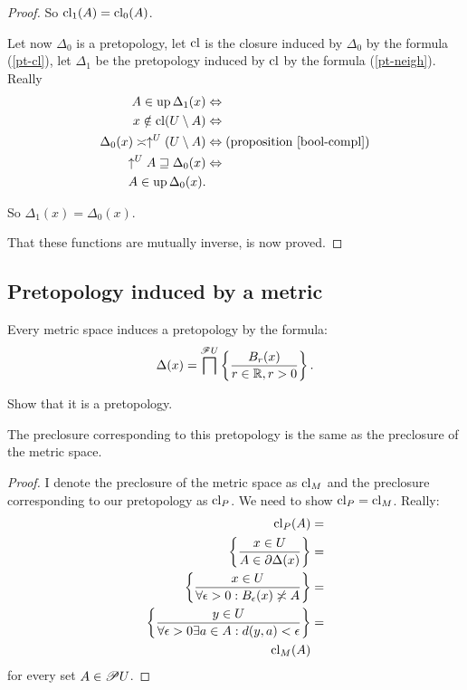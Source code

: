 \begin{proof}
So $\operatorname{cl}_{1}(A)=\operatorname{cl}_{0}(A)$.

Let now $\Delta_{0}$ is a pretopology, let $\operatorname{cl}$ is the closure
induced by $\Delta_{0}$ by the formula (\ref{pt-cl}), let $\Delta_{1}$
be the pretopology induced by $\operatorname{cl}$ by the formula (\ref{pt-neigh}).
Really
\begin{align*}
A\in\operatorname{up}\Delta_{1}(x) & \Leftrightarrow\\
x\notin\operatorname{cl}(U\setminus A) & \Leftrightarrow\\
\Delta_{0}(x)\asymp\uparrow^{U}(U\setminus A) & \Leftrightarrow\text{(proposition \ref{bool-compl})}\\
\uparrow^{U}A\sqsupseteq\Delta_{0}(x) & \Leftrightarrow\\
A\in\operatorname{up}\Delta_{0}(x).
\end{align*}


So $\Delta_{1}(x)=\Delta_{0}(x)$.

That these functions are mutually inverse, is now proved.
\end{proof}

\subsection{Pretopology induced by a metric}

Every metric space induces
a pretopology by the formula:
\[
\Delta(x)=\bigsqcap^{\mathscr{F}U}\left\{ \frac{B_{r}(x)}{r\in\mathbb{R},r>0}\right\}.
\]

\begin{xca}
Show that it is a pretopology.\end{xca}
\begin{prop}
The preclosure corresponding to this pretopology is the same as the
preclosure of the metric space.\end{prop}
\begin{proof}
I denote the preclosure of the metric space as $\operatorname{cl}_{M}$ and the
preclosure corresponding to our pretopology as $\operatorname{cl}_{P}$. We need
to show $\operatorname{cl}_{P}=\operatorname{cl}_{M}$. Really:
\begin{align*}
\operatorname{cl}_{P}(A) & =\\
\left\{ \frac{x\in U}{A\in\partial\Delta(x)}\right\} & =\\
\left\{ \frac{x\in U}{\forall\epsilon>0:B_{\epsilon}(x)\not\asymp A}\right\} & =\\
\left\{ \frac{y\in U}{\forall\epsilon>0\exists a\in A:d(y,a)<\epsilon}\right\} & =\\
\operatorname{cl}_{M}(A)
\end{align*}
for every set $A\in\mathscr{P} U$.
\end{proof}


